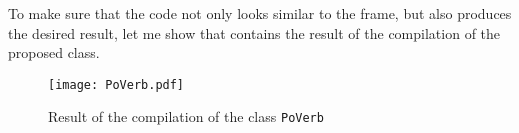To make sure that the code not only looks similar to the frame, but also produces the desired result, let me show  that contains the result of the compilation of the proposed  class.

\begin{sidewaysfigure}
\texttt{[image: PoVerb.pdf]}
\caption{Result of the compilation of the class \texttt{PoVerb} \label{fig:poverb}}
\end{sidewaysfigure}

%
%

